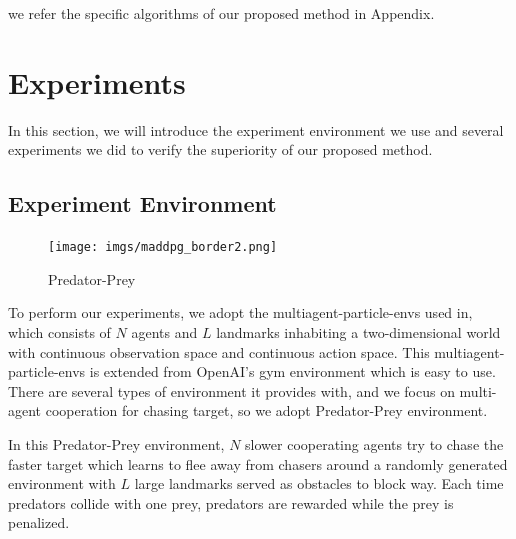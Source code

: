 \documentclass[11pt,twocolumn]{jarticle} %
\begin{document}
we refer the specific algorithms of our proposed method in Appendix. \par

\section{Experiments}
In this section, we will introduce the experiment environment we use and several experiments we did to verify the superiority of our proposed method.

\subsection{Experiment Environment}

\begin{figure}[h]
 \begin{center}
  \texttt{[image: imgs/maddpg\_border2.png]}
  \caption{Predator-Prey}
  \label{fig:predator_prey}
 \end{center}
\end{figure}

To perform our experiments, we adopt the multiagent-particle-envs used in\cite{maddpg}, which consists of $N$ agents and $L$ landmarks inhabiting a two-dimensional world with continuous observation space and continuous action space. This multiagent-particle-envs is extended from OpenAI's gym\cite{gym} environment which is easy to use. There are several types of environment it provides with, and we focus on multi-agent cooperation for chasing target, so we adopt Predator-Prey environment. \par

In this Predator-Prey environment, $N$ slower cooperating agents try to chase the faster target which learns to flee away from chasers around a randomly generated environment with $L$ large landmarks served as obstacles to block way. Each time predators collide with one prey, predators are rewarded while the prey is penalized. \par
\end{document}
